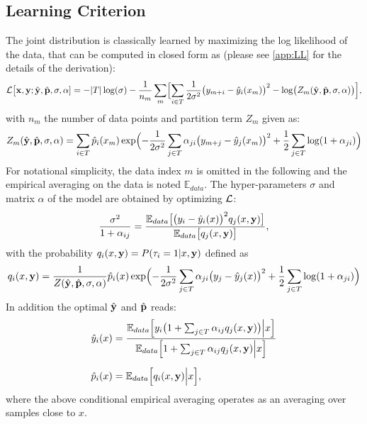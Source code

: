 \subsection{Learning Criterion}
The joint distribution is classically learned by maximizing the log likelihood of the data, that 
can be computed in closed form as (please see \cref{app:LL} for the details of the derivation): 
%
\begin{equation}\label{eq:LL}
  {\cal L}\bigl[ {\bf x, y};\hat {\bf y},\hat{\bf p},\sigma,{\bf \alpha}] = 
  -\vert T\vert\log(\sigma)-\frac{1}{n_m}\sum_m\Bigl[
    \sum_{i \in T}\frac{1}{2\sigma^2}\bigl(y_{m+i}-\hat y_i(x_m)\bigr)^2 - 
    \log\bigl(Z_m(\hat {\bf y},\hat{\bf p},\sigma,{\bf \alpha})\bigr)\Bigr],
\end{equation}
%
with $n_m$ the number of data points and partition term $Z_m$ given as:
\[
  Z_m(\hat {\bf y},\hat{\bf p},\sigma,{\bf \alpha}) = \sum_{i \in T}\hat p_i(x_m)\exp\Bigl(
    - \frac{1}{2\sigma^2}\sum_{j\in T}\alpha_{ji}\bigl(y_{m+j}-\hat y_j(x_m)\bigr)^2 
    + \frac{1}{2}\sum_{j\in T}\log(1+\alpha_{ji})\Bigr)
\]
For notational simplicity, the data index $m$ is omitted in the following and the empirical 
averaging on the data is noted ${\mathbb E}_{data}$. The hyper-parameters $\sigma$ and matrix 
$\alpha$ of the model are obtained by optimizing  ${\cal L}$:
%
\begin{equation}\label{eq:var}
  \frac{\sigma^2}{1+\alpha_{ij}} = 
  \frac{
    {\mathbb E}_{data}\bigl[\bigl(y_i-\hat y_i(x)\bigr)^2q_j(x,{\bf y})\bigr]
  }{
    {\mathbb E}_{data}\bigl[q_j(x,{\bf y})\bigr]
  },
\end{equation}
%
with the probability $q_i(x,{\bf y}) = P(\tau_i=1\vert x,{\bf y})$ defined as
%
\begin{equation}\label{eq:hatpi}
  q_i(x,{\bf y}) = \frac{1}{
    Z(\hat {\bf y},\hat{\bf p},\sigma,{\bf \alpha})
  } \hat p_i(x) 
  \exp\Bigl(
    - \frac{1}{2\sigma^2}\sum_{j\in T}\alpha_{ji}\bigl(y_j-\hat y_j(x)\bigr)^2 
    + \frac{1}{2}\sum_{j\in T}\log(1+\alpha_{ji})
  \Bigr)
\end{equation}
%
In addition the optimal $\hat {\bf y}$ and $\hat{\bf p}$ reads:
%
\begin{align}
  \hat y_i(x) &= 
    \frac{
      {\mathbb E}_{data} \Bigl[
          y_i\bigl(1+\sum_{j\in T}\alpha_{ij}q_j(x,{\bf y})\bigr)\Big\vert x
        \Bigr]
    }{
      {\mathbb E}_{data}\Bigl[1+\sum_{j\in T}\alpha_{ij}q_j(x,{\bf y})\Big\vert x\Bigr]
    }\label{eq:hyopt}\\[0.2cm]
  \hat p_i(x) &= {\mathbb E}_{data}\Bigl[q_i(x,{\bf y})\Big\vert x \Bigr],\label{eq:tildep}
\end{align}
%
where the above conditional empirical averaging operates as an averaging over samples close to $x$.

